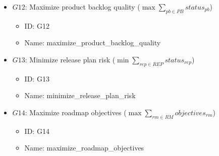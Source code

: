\documentclass{article}
\begin{document}
\begin{itemize}
    \item $G12$: Maximize product backlog quality ($\max \sum_{pb \in PB} status_{pb}$)
        \begin{itemize}
            \item ID: G12
            \item Name: maximize\_product\_backlog\_quality
        \end{itemize}
    \item $G13$: Minimize release plan risk ($\min \sum_{rep \in REP} status_{rep}$)
        \begin{itemize}
            \item ID: G13
            \item Name: minimize\_release\_plan\_risk
        \end{itemize}
    \item $G14$: Maximize roadmap objectives ($\max \sum_{rm \in RM} objectives_{rm}$)
        \begin{itemize}
            \item ID: G14
            \item Name: maximize\_roadmap\_objectives
        \end{itemize}
\end{itemize}
\end{document}
